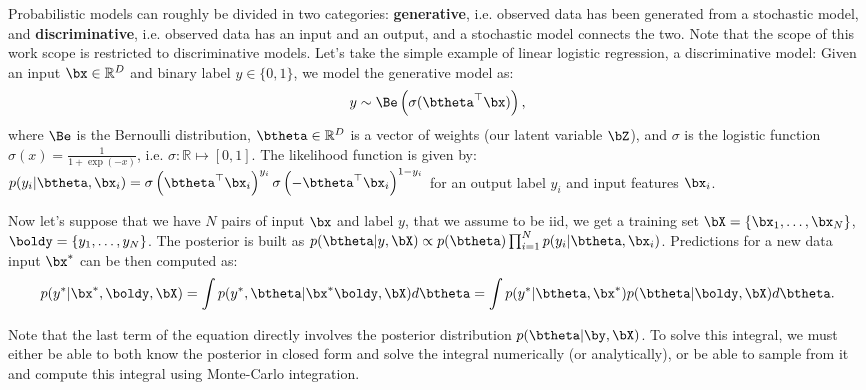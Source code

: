 Probabilistic models can roughly be divided in two categories: \textbf{generative}, i.e. observed data has been generated from a stochastic model, and \textbf{discriminative}, i.e. observed data has an input and an output, and a stochastic model connects the two.
Note that the scope of this work scope is restricted to discriminative models.
Let's take the simple example of linear logistic regression, a discriminative model:
Given an input $\bx \in \mathbb{R}^D$ and binary label $y\in \{ 0, 1\}$, we model the generative model as:
\begin{align}
    y \sim \Be\left(\sigma(\btheta^\top \bx)\right),
\end{align}
where $\Be$ is the Bernoulli distribution, $\btheta\in\mathbb{R}^D$ is a vector of weights (our latent variable $\bZ$), and $\sigma$ is the logistic function $\sigma(x) = \frac{1}{1 + \exp(-x)}$, i.e. $\sigma : \mathbb{R} \mapsto [0, 1]$.
The likelihood function is given by: $p(y_i|\btheta,\bx_i) =\sigma\left(\btheta^\top \bx_i\right)^{y_i}\sigma\left(-\btheta^\top \bx_i\right)^{1-y_i}$ for an output label $y_i$ and input features $\bx_i$.

Now let's suppose that we have $N$ pairs of input $\bx$ and label $y$, that we assume to be \ac{iid}, we get a training set $\bX = \{\bx_1,\ldots,\bx_N\}$, $\boldy = \{y_1,\ldots,y_N\}$.
The posterior is built as $p(\btheta|y,\bX) \propto p(\btheta)\prod_{i=1}^N p(y_i|\btheta, \bx_i)$.
Predictions for a new data input $\bx^*$ can be then computed as:
\begin{align}
p(y^*|\bx^*,\boldy,\bX) = \int p(y^*, \btheta|\bx^*\boldy, \bX)d\btheta = \int p(y^*|\btheta,\bx^*) p(\btheta|\boldy,\bX)d\btheta.
\end{align}

Note that the last term of the equation directly involves the posterior distribution $p(\btheta|\by,\bX)$.
To solve this integral, we must either be able to both know the posterior in closed form and solve the integral numerically (or analytically), or be able to sample from it and compute this integral using Monte-Carlo integration.

